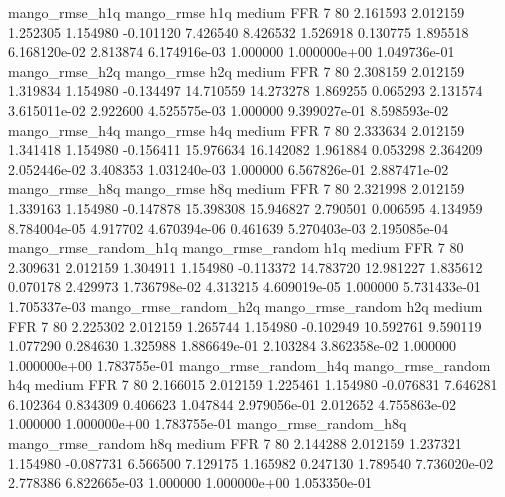        mango_rmse_h1q        mango_rmse                  h1q     medium      FFR                 7 80  2.161593       2.012159 1.252305       1.154980   -0.101120      7.426540      8.426532     1.526918       0.130775  1.895518 6.168120e-02     2.813874   6.174916e-03            1.000000    1.000000e+00        1.049736e-01
       mango_rmse_h2q        mango_rmse                  h2q     medium      FFR                 7 80  2.308159       2.012159 1.319834       1.154980   -0.134497     14.710559     14.273278     1.869255       0.065293  2.131574 3.615011e-02     2.922600   4.525575e-03            1.000000    9.399027e-01        8.598593e-02
       mango_rmse_h4q        mango_rmse                  h4q     medium      FFR                 7 80  2.333634       2.012159 1.341418       1.154980   -0.156411     15.976634     16.142082     1.961884       0.053298  2.364209 2.052446e-02     3.408353   1.031240e-03            1.000000    6.567826e-01        2.887471e-02
       mango_rmse_h8q        mango_rmse                  h8q     medium      FFR                 7 80  2.321998       2.012159 1.339163       1.154980   -0.147878     15.398308     15.946827     2.790501       0.006595  4.134959 8.784004e-05     4.917702   4.670394e-06            0.461639    5.270403e-03        2.195085e-04
mango_rmse_random_h1q mango_rmse_random                  h1q     medium      FFR                 7 80  2.309631       2.012159 1.304911       1.154980   -0.113372     14.783720     12.981227     1.835612       0.070178  2.429973 1.736798e-02     4.313215   4.609019e-05            1.000000    5.731433e-01        1.705337e-03
mango_rmse_random_h2q mango_rmse_random                  h2q     medium      FFR                 7 80  2.225302       2.012159 1.265744       1.154980   -0.102949     10.592761      9.590119     1.077290       0.284630  1.325988 1.886649e-01     2.103284   3.862358e-02            1.000000    1.000000e+00        1.783755e-01
mango_rmse_random_h4q mango_rmse_random                  h4q     medium      FFR                 7 80  2.166015       2.012159 1.225461       1.154980   -0.076831      7.646281      6.102364     0.834309       0.406623  1.047844 2.979056e-01     2.012652   4.755863e-02            1.000000    1.000000e+00        1.783755e-01
mango_rmse_random_h8q mango_rmse_random                  h8q     medium      FFR                 7 80  2.144288       2.012159 1.237321       1.154980   -0.087731      6.566500      7.129175     1.165982       0.247130  1.789540 7.736020e-02     2.778386   6.822665e-03            1.000000    1.000000e+00        1.053350e-01
